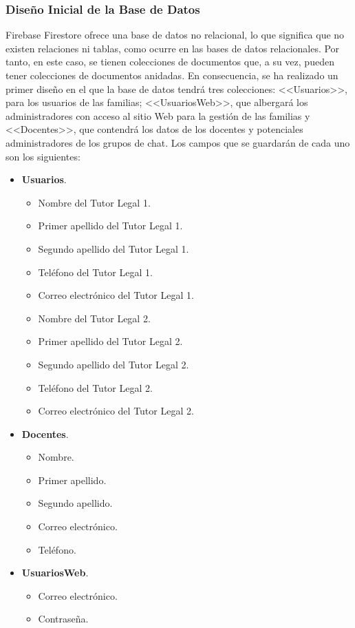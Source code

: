 \subsubsection{Diseño Inicial de la Base de Datos}
Firebase Firestore ofrece una base de datos no relacional, lo que significa que no existen relaciones ni tablas, como ocurre en las bases de datos relacionales. Por tanto, en este caso, se tienen colecciones de documentos que, a su vez, pueden tener colecciones de documentos anidadas. En consecuencia, se ha realizado un primer diseño en el que la base de datos tendrá tres colecciones: <<Usuarios>>, para los usuarios de las familias; <<UsuariosWeb>>, que albergará los administradores con acceso al sitio Web para la gestión de las familias y <<Docentes>>, que contendrá los datos de los docentes y potenciales administradores de los grupos de chat. Los campos que se guardarán de cada uno son los siguientes:

\begin{itemize}
	\item \textbf{Usuarios}.
		\begin{itemize}
			\item Nombre del Tutor Legal 1.
			\item Primer apellido del Tutor Legal 1.
			\item Segundo apellido del Tutor Legal 1.
			\item Teléfono del Tutor Legal 1.
			\item Correo electrónico del Tutor Legal 1.
			\item Nombre del Tutor Legal 2.
			\item Primer apellido del Tutor Legal 2.
			\item Segundo apellido del Tutor Legal 2.
			\item Teléfono del Tutor Legal 2.
			\item Correo electrónico del Tutor Legal 2.
		\end{itemize}
		
	\item \textbf{Docentes}.
		\begin{itemize}
			\item Nombre.
			\item Primer apellido.
			\item Segundo apellido.
			\item Correo electrónico.
			\item Teléfono.
		\end{itemize}
		
	\item \textbf{UsuariosWeb}.
		\begin{itemize}
			\item Correo electrónico.
			\item Contraseña.
		\end{itemize}
		
\end{itemize}

